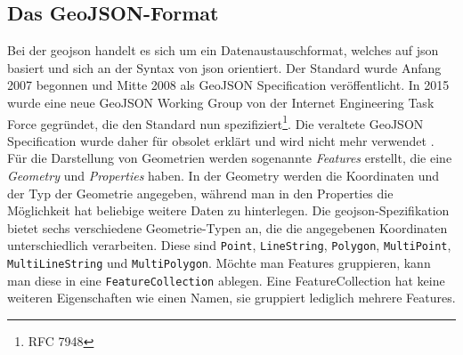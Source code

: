 \subsection{Das GeoJSON-Format}
Bei der \ac{geojson} handelt es sich um ein Datenaustauschformat, welches auf \ac{json} basiert und sich an der Syntax von \ac{json} orientiert. Der Standard wurde Anfang 2007 begonnen und Mitte 2008 als GeoJSON Specification veröffentlicht. In 2015 wurde eine neue GeoJSON Working Group von der Internet Engineering Task Force gegründet, die den Standard nun spezifiziert\footnote{RFC 7948}. Die veraltete GeoJSON Specification wurde daher für obsolet erklärt und wird nicht mehr verwendet \parencite{BUT2008}.\pbreak%
%
Für die Darstellung von Geometrien werden sogenannte \textit{Features} erstellt, die eine \textit{Geometry} und \textit{Properties} haben. In der Geometry werden die Koordinaten und der Typ der Geometrie angegeben, während man in den Properties die Möglichkeit hat beliebige weitere Daten zu hinterlegen. Die \ac{geojson}-Spezifikation bietet sechs verschiedene Geometrie-Typen an, die die angegebenen Koordinaten unterschiedlich verarbeiten. Diese sind \texttt{Point}, \texttt{LineString}, \texttt{Polygon}, \texttt{MultiPoint}, \texttt{MultiLineString} und \texttt{MultiPolygon}.
\pbreak
Möchte man Features gruppieren, kann man diese in eine \texttt{FeatureCollection} ablegen. Eine FeatureCollection hat keine weiteren Eigenschaften wie einen Namen, sie gruppiert lediglich mehrere Features.

